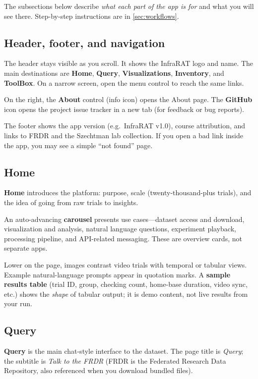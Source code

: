 \documentclass{article}
\begin{document}
The subsections below describe \emph{what each part of the app is for} and what you will see there. Step-by-step instructions are in \cref{sec:workflows}.

\subsection{Header, footer, and navigation}
\label{subsec:layout-overview}

The header stays visible as you scroll. It shows the InfraRAT logo and name. The main destinations are \textbf{Home}, \textbf{Query}, \textbf{Visualizations}, \textbf{Inventory}, and \textbf{ToolBox}. On a narrow screen, open the menu control to reach the same links.

On the right, the \textbf{About} control (info icon) opens the About page. The \textbf{GitHub} icon opens the project issue tracker in a new tab (for feedback or bug reports).

The footer shows the app version (e.g.\ InfraRAT v1.0), course attribution, and links to FRDR and the Szechtman lab collection. If you open a bad link inside the app, you may see a simple ``not found'' page.

\subsection{Home}
\label{subsec:home-overview}

\textbf{Home} introduces the platform: purpose, scale (twenty-thousand-plus trials), and the idea of going from raw trials to insights.

An auto-advancing \textbf{carousel} presents use cases---dataset access and download, visualization and analysis, natural language questions, experiment playback, processing pipeline, and API-related messaging. These are overview cards, not separate apps.

Lower on the page, images contrast video trials with temporal or tabular views. Example natural-language prompts appear in quotation marks. A \textbf{sample results table} (trial ID, group, checking count, home-base duration, video sync, etc.) shows the \emph{shape} of tabular output; it is demo content, not live results from your run.

\subsection{Query}
\label{subsec:query-overview}

\textbf{Query} is the main chat-style interface to the dataset. The page title is \emph{Query}; the subtitle is \emph{Talk to the FRDR} (FRDR is the Federated Research Data Repository, also referenced when you download bundled files).
\end{document}
